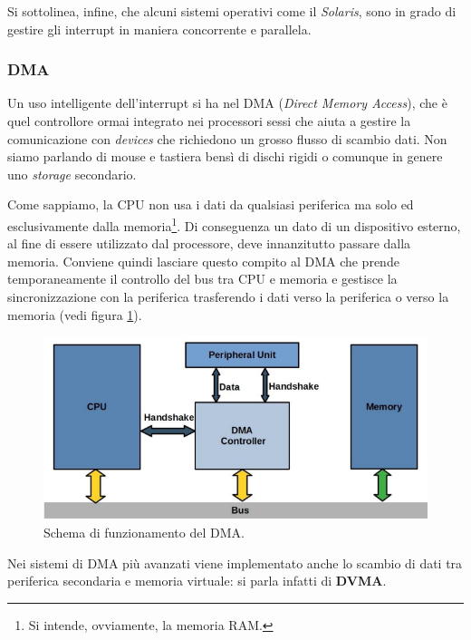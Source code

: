 Si sottolinea, infine, che alcuni sistemi operativi come il \textit{Solaris}, sono in grado di gestire gli interrupt in maniera concorrente e parallela.

% 
\subsubsection{DMA}
Un uso intelligente dell'interrupt si ha nel DMA (\textit{Direct Memory Access}), che è quel controllore ormai integrato nei processori sessi che aiuta a gestire la comunicazione con \textit{devices} che richiedono un grosso flusso di scambio dati. Non siamo parlando di mouse e tastiera bensì di dischi rigidi o comunque in genere uno \textit{storage} secondario.

Come sappiamo, la CPU non usa i dati da qualsiasi periferica ma solo ed esclusivamente dalla memoria\footnote{Si intende, ovviamente, la memoria RAM.}. Di conseguenza un dato di un dispositivo esterno, al fine di essere utilizzato dal processore, deve innanzitutto passare dalla memoria. Conviene quindi lasciare questo compito al DMA che prende temporaneamente il controllo del bus tra CPU e memoria e gestisce la sincronizzazione con la periferica trasferendo i dati verso la periferica o verso la memoria (vedi figura \ref{fig:DMA}).
\begin{figure}
    \centering
    \includegraphics[width = .7\textwidth]{../res/imgs/IO system/DMA.png}
    \caption{Schema di funzionamento del DMA.}
    \label{fig:DMA}
\end{figure}
Nei sistemi di DMA più avanzati viene implementato anche lo scambio di dati tra periferica secondaria e memoria virtuale: si parla infatti di \textbf{DVMA}.


